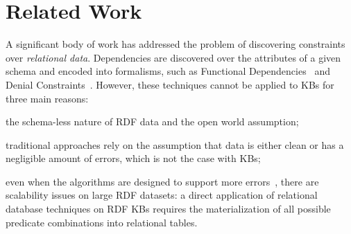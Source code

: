 \section{Related Work} \label{sec:krd_related}


A significant body of work has addressed the problem of discovering constraints over {\em relational data}. 
Dependencies are discovered over the attributes of a given schema and encoded into formalisms, such as 
Functional Dependencies~\cite{abiteboul1995foundations} %
and Denial Constraints~\cite{chu2013discovering}. 
%
%
However, these techniques cannot be applied to KBs for three main reasons:
\begin{inparaenum}[\itshape(i)]
	\item the schema-less nature of RDF data and the open world assumption; %
	\item traditional approaches rely on the assumption that data is either clean or has a negligible amount of errors, which is not the case with KBs;
	\item even when the algorithms are designed to support more errors~\cite{abedjan2015temporal,kivinen1995approximate}, there are scalability issues on large RDF datasets: a direct application of relational database techniques on RDF KBs requires the materialization of all possible predicate combinations into relational tables.
\end{inparaenum}
